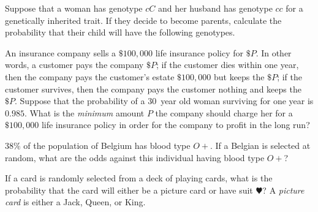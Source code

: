 \documentclass[addpoints,12pt]{exam}
\begin{document}
\begin{questions}
\question[10]
Suppose that a woman has genotype $cC$
and her husband has genotype $cc$ for a
genetically inherited trait.
If they decide to become parents, calculate the
probability that their child will
have the following genotypes.
\newpage

\question[12] An insurance company sells a $\$100,000$
life insurance policy for $\$P$. 
In other words, a customer pays the company $\$P$;
if the customer dies within one year, then the company
pays the customer's estate $\$100,000$ but keeps the $\$P$;
if the customer survives, then
the company pays the customer nothing and keeps the $\$P$. 
Suppose that the probability of a $30$~year old woman surviving
for one year is $0.985$.
What is the {\em minimum} amount $P$ the
company should charge her for a  $\$100,000$ life
insurance policy in order
for the company to profit in the long run?
\vspace{3in}

\question[8] $38\%$ of the population of Belgium has blood type $O+$.
If a Belgian is selected at random, what are the odds
against this individual having blood type $O+$?
\vspace{1in}

\question[10] If a card is randomly selected from a deck
of playing cards, what is the probability that the card
will either be a picture card or have suit $\varheart$?
A {\em picture card} is either a Jack, Queen, or King.
\newpage


\end{questions}
\end{document}
